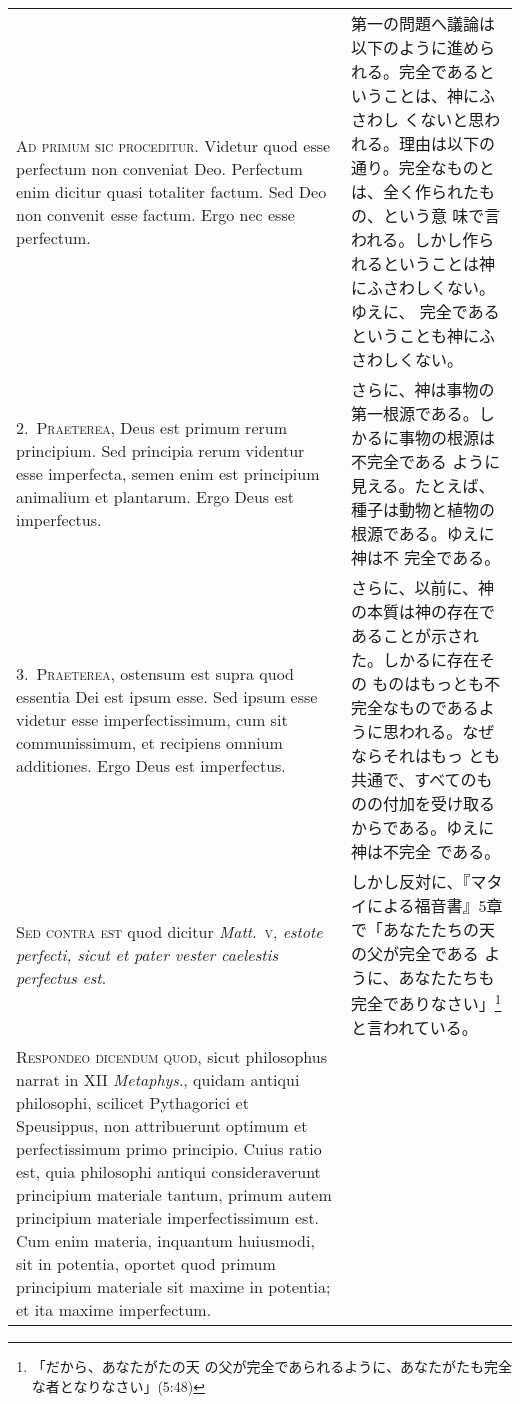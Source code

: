 \documentclass[10pt]{jsarticle} %
\begin{document}
\begin{longtable}{p{21em}p{21em}}

{\huge A}{\scshape d primum sic proceditur}. Videtur quod esse perfectum
 non conveniat Deo. Perfectum enim dicitur quasi totaliter factum. Sed
 Deo non convenit esse factum. Ergo nec esse perfectum.

&
第一の問題へ議論は以下のように進められる。完全であるということは、神にふさわし
 くないと思われる。理由は以下の通り。完全なものとは、全く作られたもの、という意
 味で言われる。しかし作られるということは神にふさわしくない。ゆえに、
 完全であるということも神にふさわしくない。

\\


2.~{\scshape Praeterea}, Deus est primum rerum principium. Sed principia
 rerum videntur esse imperfecta, semen enim est principium animalium et
 plantarum. Ergo Deus est imperfectus.

&

さらに、神は事物の第一根源である。しかるに事物の根源は不完全である
 ように見える。たとえば、種子は動物と植物の根源である。ゆえに神は不
 完全である。

\\


3.~{\scshape Praeterea}, ostensum est supra quod essentia Dei est ipsum
 esse. Sed ipsum esse videtur esse imperfectissimum, cum sit
 communissimum, et recipiens omnium additiones. Ergo Deus est
 imperfectus.
&

さらに、以前に、神の本質は神の存在であることが示された。しかるに存在その
 ものはもっとも不完全なものであるように思われる。なぜならそれはもっ
 とも共通で、すべてのものの付加を受け取るからである。ゆえに神は不完全
 である。


\\

 {\scshape Sed contra est} quod dicitur {\itshape Matt}.~{\scshape v},
 {\itshape estote perfecti, sicut et pater vester caelestis perfectus
 est}.
&

しかし反対に、『マタイによる福音書』5章で「あなたたちの天の父が完全である
 ように、あなたたちも完全でありなさい」\footnote{「だから、あなたがたの天
 の父が完全であられるように、あなたがたも完全な者となりなさい」(5:48)}と言われている。

\\


{\scshape Respondeo dicendum quod}, sicut philosophus narrat in XII
 {\itshape Metaphys}., quidam antiqui philosophi, scilicet Pythagorici
 et Speusippus, non attribuerunt optimum et perfectissimum primo
 principio. Cuius ratio est, quia philosophi antiqui consideraverunt
 principium materiale tantum, primum autem principium materiale
 imperfectissimum est. Cum enim materia, inquantum huiusmodi, sit in
 potentia, oportet quod primum principium materiale sit maxime in
 potentia; et ita maxime imperfectum.


\end{longtable}
\end{document}
